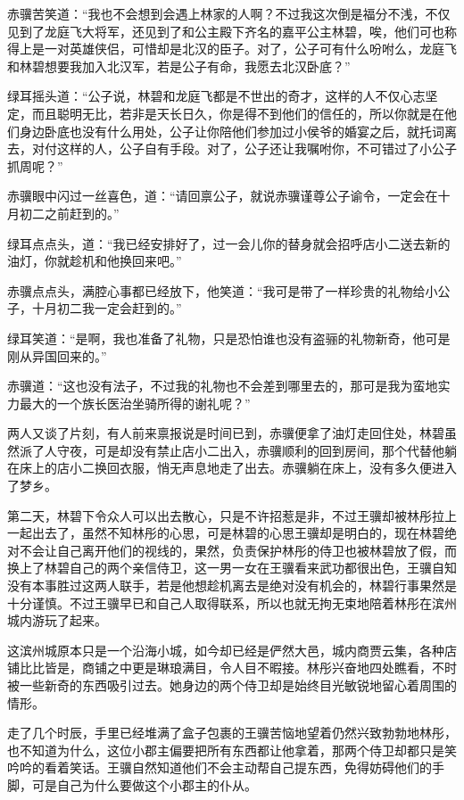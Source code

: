 赤骥苦笑道：“我也不会想到会遇上林家的人啊？不过我这次倒是福分不浅，不仅见到了龙庭飞大将军，还见到了和公主殿下齐名的嘉平公主林碧，唉，他们可也称得上是一对英雄侠侣，可惜却是北汉的臣子。对了，公子可有什么吩咐么，龙庭飞和林碧想要我加入北汉军，若是公子有命，我愿去北汉卧底？”

绿耳摇头道：“公子说，林碧和龙庭飞都是不世出的奇才，这样的人不仅心志坚定，而且聪明无比，若非是天长日久，你是得不到他们的信任的，所以你就是在他们身边卧底也没有什么用处，公子让你陪他们参加过小侯爷的婚宴之后，就托词离去，对付这样的人，公子自有手段。对了，公子还让我嘱咐你，不可错过了小公子抓周呢？”

赤骥眼中闪过一丝喜色，道：“请回禀公子，就说赤骥谨尊公子谕令，一定会在十月初二之前赶到的。”

绿耳点点头，道：“我已经安排好了，过一会儿你的替身就会招呼店小二送去新的油灯，你就趁机和他换回来吧。”

赤骥点点头，满腔心事都已经放下，他笑道：“我可是带了一样珍贵的礼物给小公子，十月初二我一定会赶到的。”

绿耳笑道：“是啊，我也准备了礼物，只是恐怕谁也没有盗骊的礼物新奇，他可是刚从异国回来的。”

赤骥道：“这也没有法子，不过我的礼物也不会差到哪里去的，那可是我为蛮地实力最大的一个族长医治坐骑所得的谢礼呢？”

两人又谈了片刻，有人前来禀报说是时间已到，赤骥便拿了油灯走回住处，林碧虽然派了人守夜，可是却没有禁止店小二出入，赤骥顺利的回到房间，那个代替他躺在床上的店小二换回衣服，悄无声息地走了出去。赤骥躺在床上，没有多久便进入了梦乡。

第二天，林碧下令众人可以出去散心，只是不许招惹是非，不过王骥却被林彤拉上一起出去了，虽然不知林彤的心思，可是林碧的心思王骥却是明白的，现在林碧绝对不会让自己离开他们的视线的，果然，负责保护林彤的侍卫也被林碧放了假，而换上了林碧自己的两个亲信侍卫，这一男一女在王骥看来武功都很出色，王骥自知没有本事胜过这两人联手，若是他想趁机离去是绝对没有机会的，林碧行事果然是十分谨慎。不过王骥早已和自己人取得联系，所以也就无拘无束地陪着林彤在滨州城内游玩了起来。

这滨州城原本只是一个沿海小城，如今却已经是俨然大邑，城内商贾云集，各种店铺比比皆是，商铺之中更是琳琅满目，令人目不暇接。林彤兴奋地四处瞧看，不时被一些新奇的东西吸引过去。她身边的两个侍卫却是始终目光敏锐地留心着周围的情形。

走了几个时辰，手里已经堆满了盒子包裹的王骥苦恼地望着仍然兴致勃勃地林彤，也不知道为什么，这位小郡主偏要把所有东西都让他拿着，那两个侍卫却都只是笑吟吟的看着笑话。王骥自然知道他们不会主动帮自己提东西，免得妨碍他们的手脚，可是自己为什么要做这个小郡主的仆从。

